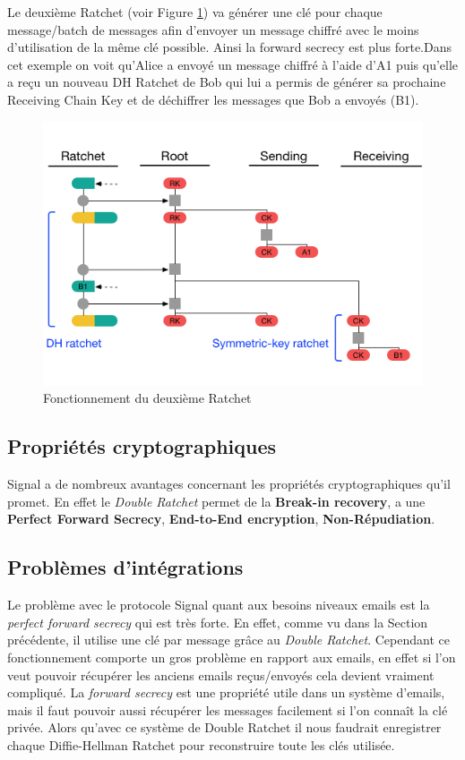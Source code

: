 Le deuxième Ratchet (voir Figure \ref{fig:signalSecond}) va générer une clé pour chaque message/batch de messages afin d'envoyer un message chiffré avec le moins d'utilisation de la même clé possible. Ainsi la forward secrecy est plus forte.Dans cet exemple on voit qu'Alice a envoyé un message chiffré à l'aide d'A1 puis qu'elle a reçu un nouveau DH Ratchet de Bob qui lui a permis de générer sa prochaine Receiving Chain Key et de déchiffrer les messages que Bob a envoyés (B1).

\begin{figure}[h!]
	\centering
	\includegraphics[width=12cm]{images/secondRatchet.png}
	\caption{Fonctionnement du deuxième Ratchet~\cite{doubleratchet}}
	\label{fig:signalSecond}
\end{figure}

\subsection{Propriétés cryptographiques}
Signal a de nombreux avantages concernant les propriétés cryptographiques qu'il promet. En effet le \textit{Double Ratchet} permet de la \textbf{Break-in recovery}, a une \textbf{Perfect Forward Secrecy}, \textbf{End-to-End encryption}, \textbf{Non-Répudiation}.
\subsection{Problèmes d'intégrations}
Le problème avec le protocole Signal quant aux besoins niveaux emails est la \textit{perfect forward secrecy} qui est très forte. En effet, comme vu dans la Section précédente, il utilise une clé par message grâce au \textit{Double Ratchet}. Cependant ce fonctionnement comporte un gros problème en rapport aux emails, en effet si l'on veut pouvoir récupérer les anciens emails reçus/envoyés cela devient vraiment compliqué. La \textit{forward secrecy} est une propriété utile dans un système d'emails, mais il faut pouvoir aussi récupérer les messages facilement si l'on connaît la clé privée. Alors qu'avec ce système de Double Ratchet il nous faudrait enregistrer chaque Diffie-Hellman Ratchet pour reconstruire toute les clés utilisée.
